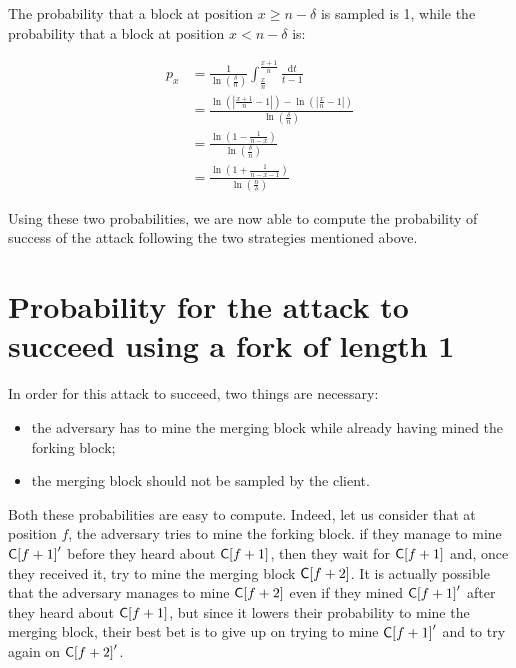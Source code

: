         The probability that a block at position \(x\geqslant n-\delta\) is sampled is 1, while the probability that a block at position \(x< n-\delta\) is:
        
        \begin{align*}
          p_x &= \frac{1}{\ln\left(\frac{\delta}{n}\right)}\int_{\frac{x}{n}}^{\frac{x+1}{n}}\frac{\mathrm{d}t}{t-1}\\
          &= \frac{\ln\left(\left|\frac{x+1}{n}-1\right|\right)-\ln\left(\left|\frac{x}{n}-1\right|\right)}{\ln\left(\frac{\delta}{n}\right)}\\
          &= \frac{\ln\left(1-\frac{1}{n-x}\right)}{\ln\left(\frac{\delta}{n}\right)}\\
          &= \frac{\ln\left(1+\frac{1}{n-x-1}\right)}{\ln\left(\frac{n}{\delta}\right)}
        \end{align*}

        Using these two probabilities, we are now able to compute the probability of success of the attack following the two strategies mentioned above.

        \section{Probability for the attack to succeed using a fork of length 1}
          In order for this attack to succeed, two things are necessary:

          \begin{itemize}
            \item the adversary has to mine the merging block while already having mined the forking block;
            \item the merging block should not be sampled by the client.
          \end{itemize}

          Both these probabilities are easy to compute. Indeed, let us consider that at position \(f\), the adversary tries to mine the forking block. if they manage to mine \(\mathsf{C[}f+1\mathsf{]}'\) before they heard about \(\mathsf{C[}f+1\mathsf{]}\), then they wait for \(\mathsf{C[}f+1\mathsf{]}\) and, once they received it, try to mine the merging block \(\mathsf{C[}f+2\mathsf{]}\). It is actually possible that the adversary manages to mine \(\mathsf{C[}f+2\mathsf{]}\) even if they mined \(\mathsf{C[}f+1\mathsf{]}'\) after they heard about \(\mathsf{C[}f+1\mathsf{]}\), but since it lowers their probability to mine the merging block, their best bet is to give up on trying to mine \(\mathsf{C[}f+1\mathsf{]}'\) and to try again on \(\mathsf{C[}f+2\mathsf{]}'\).


